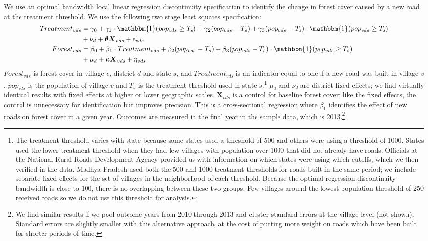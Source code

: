 We use an optimal bandwidth local linear regression discontinuity
specification \cite{IL08,IK12,GI14} to identify the change in forest
cover caused by a new road at the treatment threshold. We use the
following two stage least squares specification:
\begin{align} 
\label{eq:rd1} 
\nonumber Treatment_{vds} &= \gamma_0 + \gamma_1\cdot \mathbbm{1} (pop_{vds} \ge T_s) + \gamma_2 (pop_{vds} - T_s)
               + \gamma_3 (pop_{vds} - T_s)\cdot \mathbbm{1} (pop_{vds}
               \ge T_s) \\  &+ \nu_d + \boldsymbol \theta \boldsymbol{X}_{vds}
               + \epsilon_{vds} 
\\
\nonumber Forest_{vds} &= \beta_0 + \beta_1\cdot Treatment_{vds} + \beta_2 (pop_{vds} - T_s)
             + \beta_3 (pop_{vds} - T_s)\cdot \mathbbm{1} (pop_{vds} \ge T_s) 
\\  &+ \mu_d + \boldsymbol \kappa \boldsymbol{X}_{vds} + \eta_{vds}
\end{align} 
\noindent 
$Forest_{vds}$ is forest cover in village $v$, district $d$ and state
$s$, and $Treatment_{vds}$ is an indicator equal to one if a new road
was built in village $v$. $pop_{vds}$ is the population of village $v$
and $T_s$ is the treatment threshold used in state $s$.\footnote{The
  treatment threshold varies with state because some states used a
  threshold of 500 and others were using a threshold of 1000. States
  used the lower treatment threshold when they had few villages with
  population over 1000 that did not already have roads. Officials at
  the National Rural Roads Development Agency provided us with
  information on which states were using which cutoffs, which we then
  verified in the data. Madhya Pradesh used both the 500 and 1000
  treatment thresholds for roads built in the same period; we include
  separate fixed effects for the set of villages in the neighborhood
  of each threshold. Because the optimal regression discontinuity
  bandwidth is close to 100, there is no overlapping between these two
  groups. Few villages around the lowest population threshold of 250
  received roads so we do not use this threshold for analysis.}
$\mu_d$ and $\nu_d$ are district fixed effects; we find virtually
identical results with fixed effects at higher or lower geographic
scales. $\boldsymbol{X}_{vds}$ is a control for baseline forest cover;
like the fixed effects, the control is unnecessary for identification
but improves precision. This is a cross-sectional regression where
$\beta_1$ identifies the effect of new roads on forest cover in a
given year. Outcomes are measured in the final year in the sample
data, which is 2013.\footnote{We find similar results if we pool
  outcome years from 2010 through 2013 and cluster standard errors at
  the village level (not shown). Standard errors are slightly smaller
  with this alternative approach, at the cost of putting more weight
  on roads which have been built for shorter periods of time.}

